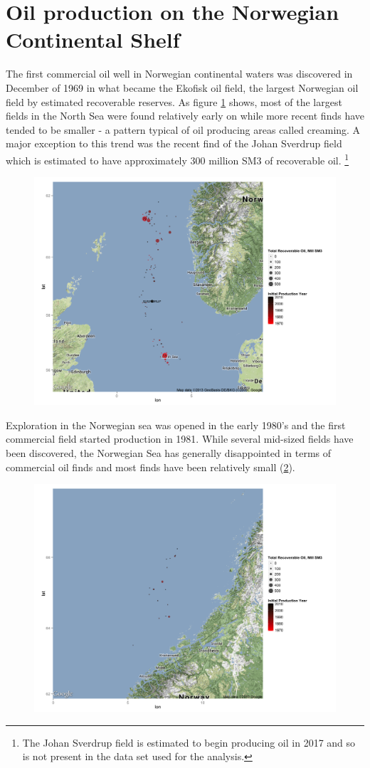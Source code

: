 \documentclass[12pt]{scrartcl} %
\begin{document}
\section{Oil production on the Norwegian Continental Shelf}
The first commercial oil well in Norwegian continental waters was discovered in December of 1969 in what became the Ekofisk oil field, the largest Norwegian oil field by estimated recoverable reserves.  As figure \ref{north_sea_reserves} shows, most of the largest fields in the North Sea were found relatively early on while more recent finds have tended to be smaller - a pattern typical of oil producing areas called creaming.  A major exception to this trend was the recent find of the Johan Sverdrup field which is estimated to have approximately 300 million SM3 of recoverable oil. \footnote{The Johan Sverdrup field is estimated to begin producing oil in 2017 and so is not present in the data set used for the analysis.}  

\begin{figure}
\includegraphics[width=.8\textwidth]{north_sea_reserves.png}
\caption{}
\label{north_sea_reserves}
\end{figure}

Exploration in the Norwegian sea was opened in the early 1980’s and the first commercial field started production in 1981.  While several mid-sized fields have been discovered, the Norwegian Sea has generally disappointed in terms of commercial oil finds and most finds have been relatively small (\ref{norwegian_sea_reserves}).  

\begin{figure}
\includegraphics[width=.8\textwidth]{norwegian_sea_reserves.png}
\caption{}
\label{norwegian_sea_reserves}
\end{figure}
\end{document}
